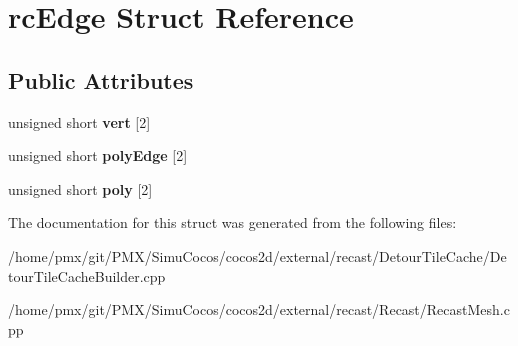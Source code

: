 \hypertarget{structrcEdge}{}\section{rc\+Edge Struct Reference}
\label{structrcEdge}
\subsection*{Public Attributes}
\begin{DoxyCompactItemize}
\item 
\mbox{\label{structrcEdge_a7c483c5d52d1caa50d3305c175822bcc}} 
unsigned short {\bfseries vert} \mbox{[}2\mbox{]}
\item 
\mbox{\label{structrcEdge_ab20ad72bbcb3029d46c375f3b9358d07}} 
unsigned short {\bfseries poly\+Edge} \mbox{[}2\mbox{]}
\item 
\mbox{\label{structrcEdge_a8c7453ea99462ccd11a1a4df861897db}} 
unsigned short {\bfseries poly} \mbox{[}2\mbox{]}
\end{DoxyCompactItemize}


The documentation for this struct was generated from the following files\+:\begin{DoxyCompactItemize}
\item 
/home/pmx/git/\+P\+M\+X/\+Simu\+Cocos/cocos2d/external/recast/\+Detour\+Tile\+Cache/Detour\+Tile\+Cache\+Builder.\+cpp\item 
/home/pmx/git/\+P\+M\+X/\+Simu\+Cocos/cocos2d/external/recast/\+Recast/Recast\+Mesh.\+cpp\end{DoxyCompactItemize}
